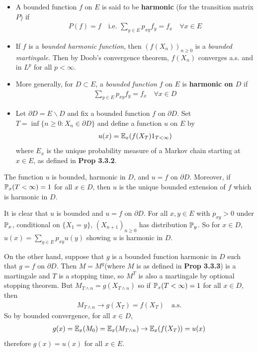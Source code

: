 \documentclass[12pt,a4paper]{report}
\newenvironment{proof}
{\begin{changemargin}{1cm}{0.5cm} 
	}%
	{\end{changemargin}
}
\begin{document}
\begin{itemize}
\item A bounded function $f$ on $E$ is said to be \textbf{harmonic} (for the transition matrix $P$) if 
\begin{align*}
P(f) = f \quad \text{i.e. } \sum_{y\in E} p_{xy}f_y = f_x \quad \forall x\in E
\end{align*}
\item If $f$ is a \emph{bounded harmonic function}, then $(f(X_n))_{n\geq 0}$ is a \emph{bounded martingale.} Then by Doob's convergence theorem, $f(X_n)$ converges a.s. and in $L^p$ for all $p<\infty$.
\item More generally, for $D\subset E$, a \emph{bounded function} $f$ on $E$ is \textbf{harmonic on $D$} if
\begin{align*}
\sum_{y\in E} p_{xy}f_y = f_x \quad \forall x\in D
\end{align*}
\item Let $\partial D = E\backslash D$ and fix a bounded function $f$ on $\partial D$. Set $T= \inf \{n\geq 0: X_n \in \partial D \}$ and define a function $u$ on $E$ by
\begin{align*}
u(x) = \mathbb{E}_x (f(X_T) 1_{T<\infty} )
\end{align*}
where $E_x$ is the unique probability measure of a Markov chain starting at $x \in E$, as defined in \textbf{Prop 3.3.2}.
\end{itemize}
\s

 The function $u$ is bounded, harmonic in $D$, and $u=f$ on $\partial D$. Moreover, if $\mathbb{P}_x (T<\infty) =1 $ for all $x\in D$, then $u$ is the unique bounded extension of $f$ which is harmonic in $D$.
\begin{proof}
\pf It is clear that $u$ is bounded and $u = f$ on $\partial D$. For all $x,y\in E$ with $p_{xy}>0$ under $\mathbb{P}_x$, conditional on $\{X_1 = y \}$, $(X_{n+1})_{n\geq 0}$ has distribution $\mathbb{P}_y$. So for $x\in D$, $u(x)= \sum_{y\in E} p_{xy} u(y)$ showing $u$ is harmonic in $D$.

\quad On the other hand, suppose that $g$ is a bounded function harmonic in $D$ such that $g= f$ on $\partial D$. Then $M = M^g$(where $M$ is as defined in \textbf{Prop 3.3.3}) is a martingale and $T$ is a stopping time, so $M^T$ is also a martingale by optional stopping theorem. But $M_{T \wedge n} = g(X_{T\wedge n})$ so if $\mathbb{P}_x (T <\infty)=1$ for all $x\in D$, then
\begin{align*}
M_{T \wedge n} \rightarrow g(X_T) = f(X_T) \quad \text{a.s.}
\end{align*}
So by bounded convergence, for all $x\in D$,
\begin{align*}
g(x) = \mathbb{E}_x (M_0) = \mathbb{E}_x (M_{T\wedge n}) \rightarrow \mathbb{E}_x(f(X_T)) = u(x)
\end{align*}
therefore $g(x) = u(x)$ for all $x\in E$.

\eop
\end{proof}
\s
\end{document}
